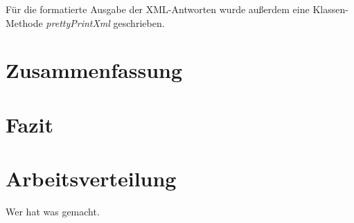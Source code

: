 \documentclass[150]{HSMW-Thesis}
\begin{document}
	Für die formatierte Ausgabe der XML-Antworten wurde außerdem eine Klassen-Methode \emph{prettyPrintXml} geschrieben.
	
	
	
\chapter{Zusammenfassung}
\chapter{Fazit}
\chapter{Arbeitsverteilung}
Wer hat was gemacht.

\Anhang


\begin{thebibliography}{99}
\bibitem{} 
\end{thebibliography}
\end{document}
